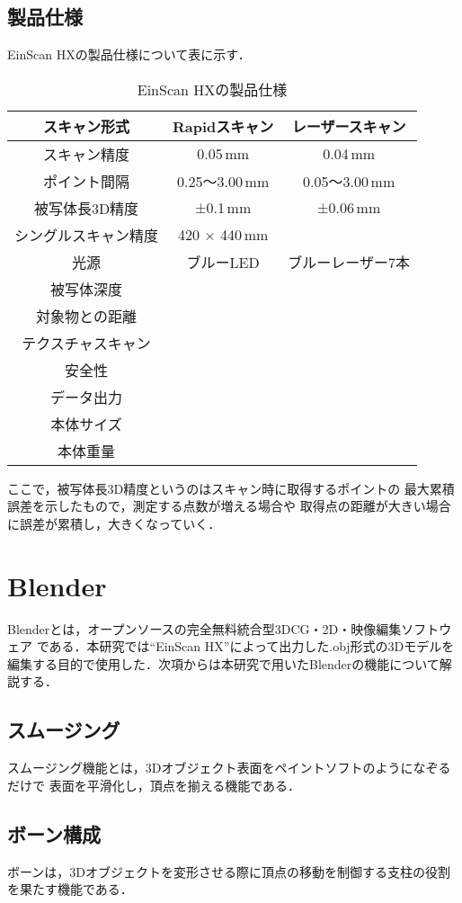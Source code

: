 \documentclass{ltjsreport}
\begin{document}
		\subsection{製品仕様}
			EinScan HXの製品仕様について表に示す．
			\begin{table}[H]
			\begin{center}
			\caption{EinScan HXの製品仕様}
			\label{tab:EinScan}
			\begin{tabular}{c|cc} \toprule
				スキャン形式&Rapidスキャン&レーザースキャン\\ \hline
				スキャン精度&0.05\,mm&0.04\,mm\\
				ポイント間隔&0.25～3.00\,mm&0.05～3.00\,mm\\
				被写体長3D精度&±0.1\,mm&±0.06\,mm\\
				シングルスキャン精度&420 × 440\,mm&\\
				光源&ブルーLED&ブルーレーザー7本\\
				被写体深度&&\\
				対象物との距離&&\\
				テクスチャスキャン&&\\
				安全性&&\\
				データ出力&&\\
				本体サイズ&&\\
				本体重量&&\\
				\bottomrule
			\end{tabular}
			\end{center}
			\end{table}
			ここで，被写体長3D精度というのはスキャン時に取得するポイントの
			最大累積誤差を示したもので，測定する点数が増える場合や
			取得点の距離が大きい場合に誤差が累積し，大きくなっていく．

	\section{Blender}
	
		Blenderとは，オープンソースの完全無料統合型3DCG・2D・映像編集ソフトウェア
		である．本研究では``EinScan HX''によって出力した.obj形式の3Dモデルを
		編集する目的で使用した．次項からは本研究で用いたBlenderの機能について解説する．
		\subsection{スムージング}
			スムージング機能とは，3Dオブジェクト表面をペイントソフトのようになぞるだけで
			表面を平滑化し，頂点を揃える機能である．
		\subsection{ボーン構成}
			ボーンは，3Dオブジェクトを変形させる際に頂点の移動を制御する支柱の役割を果たす機能である．
\end{document}
